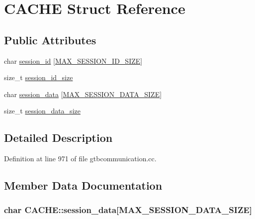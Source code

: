 \hypertarget{structCACHE}{\section{C\-A\-C\-H\-E Struct Reference}
\label{structCACHE}
}
\subsection*{Public Attributes}
\begin{DoxyCompactItemize}
\item 
char \hyperlink{structCACHE_a546945d83f3c1401f06d1cfdf5107689}{session\-\_\-id} \mbox{[}\hyperlink{gtbcommunication_8cc_adce962b5553591d36b5e51bdc06ec2eb}{M\-A\-X\-\_\-\-S\-E\-S\-S\-I\-O\-N\-\_\-\-I\-D\-\_\-\-S\-I\-Z\-E}\mbox{]}
\item 
size\-\_\-t \hyperlink{structCACHE_ad06d74c3164389ccc45261443bafc460}{session\-\_\-id\-\_\-size}
\item 
char \hyperlink{structCACHE_a92a4c57e09f7d5e310256f044cf152a8}{session\-\_\-data} \mbox{[}\hyperlink{gtbcommunication_8cc_a235acd5aaa5caea1f0ec56b02e1ba2ea}{M\-A\-X\-\_\-\-S\-E\-S\-S\-I\-O\-N\-\_\-\-D\-A\-T\-A\-\_\-\-S\-I\-Z\-E}\mbox{]}
\item 
size\-\_\-t \hyperlink{structCACHE_ab8dfd4baa14b034eaedad34115ad06f5}{session\-\_\-data\-\_\-size}
\end{DoxyCompactItemize}


\subsection{Detailed Description}


Definition at line 971 of file gtbcommunication.\-cc.



\subsection{Member Data Documentation}
\hypertarget{structCACHE_a92a4c57e09f7d5e310256f044cf152a8}{
\subsubsection[{session\-\_\-data}]{\setlength{\rightskip}{0pt plus 5cm}char C\-A\-C\-H\-E\-::session\-\_\-data\mbox{[}{\bf M\-A\-X\-\_\-\-S\-E\-S\-S\-I\-O\-N\-\_\-\-D\-A\-T\-A\-\_\-\-S\-I\-Z\-E}\mbox{]}}}\label{structCACHE_a92a4c57e09f7d5e310256f044cf152a8}


